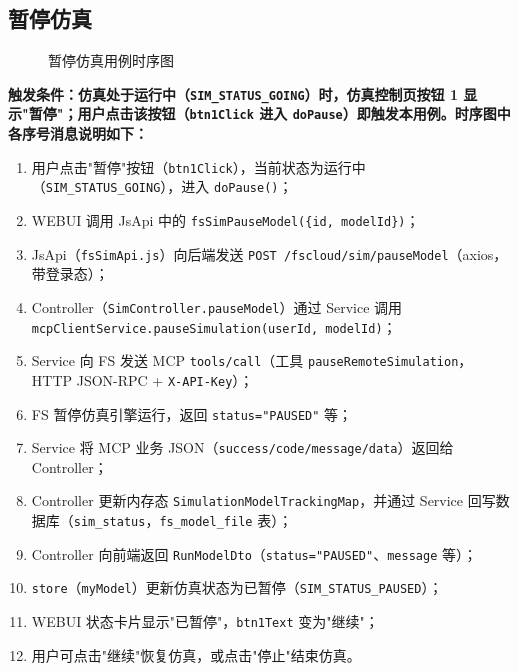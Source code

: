 \newpage
\subsection{暂停仿真}
\begin{figure}[!h]
	\centering
	\resizebox{1.0\linewidth}{!}{}
	\caption{暂停仿真用例时序图}\label{fig:pauseModel}
\end{figure}
\bf{触发条件}：仿真处于运行中（\texttt{SIM\_STATUS\_GOING}）时，仿真控制页按钮 1 显示"暂停"；用户点击该按钮（\texttt{btn1Click} 进入 \texttt{doPause}）即触发本用例。时序图中各序号消息说明如下：
\begin{enumerate}[label=\arabic*)]
	\item 用户点击"暂停"按钮（\texttt{btn1Click}），当前状态为运行中（\texttt{SIM\_STATUS\_GOING}），进入 \texttt{doPause()}；
	\item WEBUI 调用 JsApi 中的 \texttt{fsSimPauseModel(\{id, modelId\})}；
	\item JsApi（\texttt{fsSimApi.js}）向后端发送 \texttt{POST /fscloud/sim/pauseModel}（axios，带登录态）；
	\item Controller（\texttt{SimController.pauseModel}）通过 Service 调用 \texttt{mcpClientService.pauseSimulation(userId, modelId)}；
	\item Service 向 FS 发送 MCP \texttt{tools/call}（工具 \texttt{pauseRemoteSimulation}，HTTP JSON-RPC + \texttt{X-API-Key}）；
	\item FS 暂停仿真引擎运行，返回 \texttt{status="PAUSED"} 等；
	\item Service 将 MCP 业务 JSON（\texttt{success/code/message/data}）返回给 Controller；
	\item Controller 更新内存态 \texttt{SimulationModelTrackingMap}，并通过 Service 回写数据库（\texttt{sim\_status}，\texttt{fs\_model\_file} 表）；
	\item Controller 向前端返回 \texttt{RunModelDto}（\texttt{status="PAUSED"}、\texttt{message} 等）；
	\item \texttt{store}（\texttt{myModel}）更新仿真状态为已暂停（\texttt{SIM\_STATUS\_PAUSED}）；
	\item WEBUI 状态卡片显示"已暂停"，\texttt{btn1Text} 变为"继续"；
	\item 用户可点击"继续"恢复仿真，或点击"停止"结束仿真。
\end{enumerate}
\newpage

